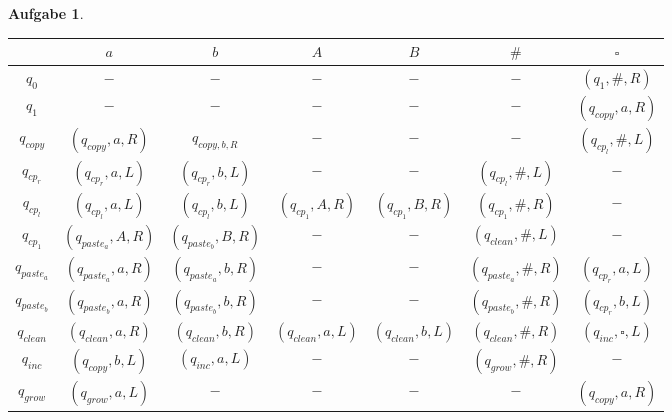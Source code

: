 \documentclass[11pt]{article}
\theoremstyle{break}
\newtheorem{task}{Aufgabe}
\begin{document}
\begin{task}
    \hfill\vspace{-4mm}\\
    \begin{tabular}{c|c|c|c|c|c|c}
        &$a$&$b$&$A$&$B$&$\#$&$\square$\\\hline
        $q_0$&$-$&$-$&$-$&$-$&$-$&$(q_1,\#,R)$\\\hline
        $q_1$&$-$&$-$&$-$&$-$&$-$&$(q_{copy},a,R)$\\\hline
        $q_{copy}$&$(q_{copy},a,R)$&$q_{copy,b,R}$&$-$&$-$&$-$&$(q_{cp_l},\#,L)$\\\hline
        $q_{cp_{r}}$&$(q_{cp_{r}},a,L)$&$(q_{cp_{r}},b,L)$&$-$&$-$&$(q_{cp_l},\#,L)$&$-$\\\hline
        $q_{cp_l}$&$(q_{cp_l},a,L)$&$(q_{cp_l},b,L)$&$(q_{cp_1},A,R)$&$(q_{cp_1},B,R)$&$(q_{cp_1},\#,R)$&$-$\\\hline
        $q_{cp_1}$&$(q_{paste_a},A,R)$&$(q_{paste_b},B,R)$&$-$&$-$&$(q_{clean},\#,L)$&$-$\\\hline
        $q_{paste_a}$&$(q_{paste_a},a,R)$&$(q_{paste_a},b,R)$&$-$&$-$&$(q_{paste_a},\#,R)$&$(q_{cp_{r}},a,L)$\\\hline
        $q_{paste_b}$&$(q_{paste_b},a,R)$&$(q_{paste_b},b,R)$&$-$&$-$&$(q_{paste_b},\#,R)$&$(q_{cp_{r}},b,L)$\\\hline
        $q_{clean}$&$(q_{clean},a,R)$&$(q_{clean},b,R)$&$(q_{clean},a,L)$&$(q_{clean},b,L)$&$(q_{clean},\#,R)$&$(q_{inc},\square,L)$\\\hline
        $q_{inc}$&$(q_{copy},b,L)$&$(q_{inc},a,L)$&$-$&$-$&$(q_{grow},\#,R)$&$-$\\\hline
        $q_{grow}$&$(q_{grow},a,L)$&$-$&$-$&$-$&$-$&$(q_{copy},a,R)$
    \end{tabular}
\end{task}
\end{document}
